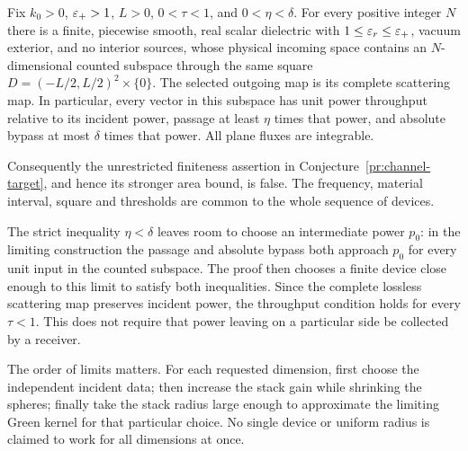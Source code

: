 \begin{theorem}
\label{uc:counterexample}
Fix $k_0>0$, $\varepsilon_+>1$, $L>0$, $0<\tau<1$, and
$0<\eta<\delta$. For every positive integer $N$ there is a finite,
piecewise smooth, real scalar dielectric with
$1\leq\varepsilon_r\leq\varepsilon_+$, vacuum exterior, and no interior sources,
whose physical incoming space contains an $N$-dimensional counted
subspace through the same square
$D=(-L/2,L/2)^2\times\{0\}$. The selected outgoing map is its
complete scattering map. In particular, every vector in this subspace
has unit power throughput relative to its incident power, passage at
least $\eta$ times that power, and absolute bypass at most $\delta$
times that power. All plane fluxes are integrable.

Consequently the unrestricted finiteness assertion in
Conjecture~\ref{pr:channel-target}, and hence its stronger area bound,
is false. The frequency, material interval, square and thresholds
are common to the whole sequence of devices.
\end{theorem}
The strict inequality $\eta<\delta$ leaves room to choose an intermediate
power $p_0$: in the limiting construction the passage and absolute bypass
both approach $p_0$ for every unit input in the counted subspace.  The proof
then chooses a finite device close enough to this limit to satisfy both
inequalities.  Since the complete lossless scattering map preserves incident
power, the throughput condition holds for every $\tau<1$.  This does not
require that power leaving on a particular side be collected by a receiver.

The order of limits matters.  For each requested dimension, first choose
the independent incident data; then increase the stack gain while shrinking
the spheres; finally take the stack radius large enough to approximate the
limiting Green kernel for that particular choice.  No single device or
uniform radius is claimed to work for all dimensions at once.

